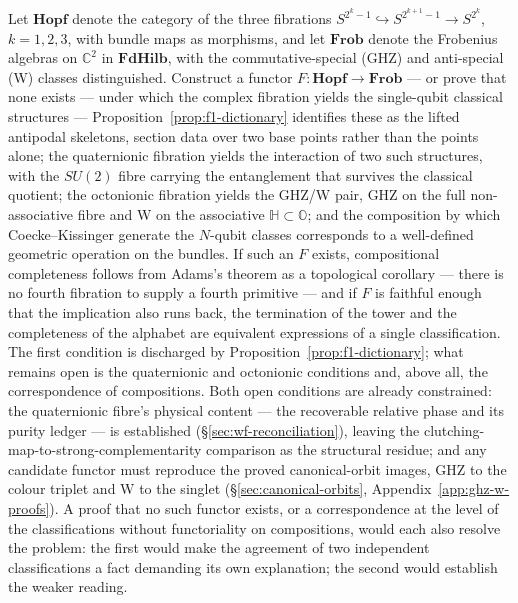\begin{openproblem}\label{op:hopf-frobenius} Let
$\mathbf{Hopf}$ denote the category of the three fibrations
$S^{2^{k}-1} \hookrightarrow S^{2^{k+1}-1} \to S^{2^{k}}$, $k = 1, 2, 3$, with bundle maps as
morphisms, and let $\mathbf{Frob}$ denote the Frobenius algebras on $\mathbb{C}^{2}$ in
$\mathbf{FdHilb}$, with the commutative-special (GHZ) and anti-special (W) classes
distinguished. Construct a functor $F \colon \mathbf{Hopf} \to \mathbf{Frob}$ --- or prove that
none exists --- under which the complex fibration yields the single-qubit classical structures
--- Proposition~\ref{prop:f1-dictionary} identifies these as the lifted antipodal skeletons,
section data over two base points rather than the points alone; the quaternionic fibration
yields the interaction of two such structures, with the $SU(2)$ fibre carrying the entanglement
that survives the classical quotient; the octonionic fibration yields the GHZ/W pair, GHZ on the
full non-associative fibre and W on the associative $\mathbb{H} \subset \mathbb{O}$; and the
composition by which Coecke--Kissinger generate the $N$-qubit classes corresponds to a
well-defined geometric operation on the bundles. If such an $F$ exists, compositional
completeness follows from Adams's theorem as a topological corollary --- there is no fourth
fibration to supply a fourth primitive --- and if $F$ is faithful enough that the implication
also runs back, the termination of the tower and the completeness of the alphabet are equivalent
expressions of a single classification. The first condition is discharged by
Proposition~\ref{prop:f1-dictionary}; what remains open is the quaternionic and octonionic
conditions and, above all, the correspondence of compositions. Both open conditions are already
constrained: the quaternionic fibre's physical content --- the recoverable relative phase and
its purity ledger --- is established (\S\ref{sec:wf-reconciliation}), leaving the
clutching-map-to-strong-complementarity comparison as the structural residue; and any candidate
functor must reproduce the proved canonical-orbit images, GHZ to the colour triplet and W to the
singlet (\S\ref{sec:canonical-orbits}, Appendix~\ref{app:ghz-w-proofs}). A proof that no such
functor exists, or a correspondence at the level of the classifications without functoriality on
compositions, would each also resolve the problem: the first would make the agreement of two
independent classifications a fact demanding its own explanation; the second would establish the
weaker reading.
\end{openproblem}

